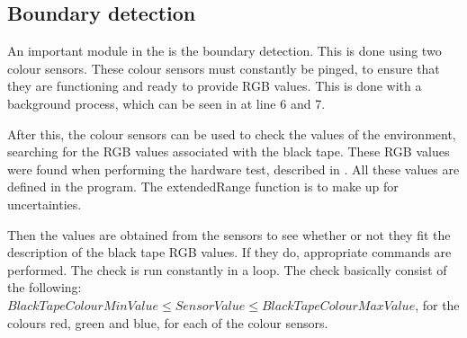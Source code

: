%			


\subsection{Boundary detection}
An important module in the \projname{} is the boundary detection. This is done using two colour sensors. These colour sensors must constantly be pinged, to ensure that they are functioning and ready to provide RGB values. This is done with a background process, which can be seen in  at line 6 and 7. 

After this, the colour sensors can be used to check the values of the environment, searching for the RGB values associated with the black tape. These RGB values were found when performing the hardware test, described in . All these values are defined in the program. The extendedRange function is to make up for uncertainties. 

Then the values are obtained from the sensors to see whether or not they fit the description of the black tape RGB values. If they do, appropriate commands are performed. The check is run constantly in a loop. The check basically consist of the following: $BlackTapeColourMinValue \leq SensorValue \leq BlackTapeColourMaxValue$, for the colours red, green and blue, for each of the colour sensors. 

